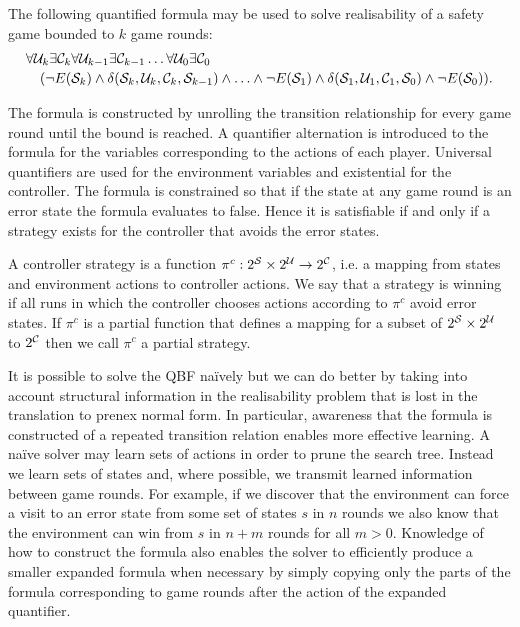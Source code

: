 The following quantified formula may be used to solve realisability of a safety game bounded to $k$ game rounds: 
\begin{equation*}
\begin{multlined}
    \forall \cU_k \exists \cC_k \forall \cU_{k-1} \exists \cC_{k-1} \ldots \forall \cU_0 \exists \cC_0 \\
    (\lnot E(\cS_k) \land \delta(\cS_k, \cU_k, \cC_k, \cS_{k-1}) \land \ldots \land \lnot E(\cS_1) \land \delta(\cS_1, \cU_1, \cC_1, \cS_0) \land \lnot E(\cS_0)).
\end{multlined}
\end{equation*}

The formula is constructed by unrolling the transition relationship for every game round until the bound is reached. A quantifier alternation is introduced to the formula for the variables corresponding to the actions of each player. Universal quantifiers are used for the environment variables and existential for the controller. The formula is constrained so that if the state at any game round is an error state the formula evaluates to false. Hence it is satisfiable if and only if a strategy exists for the controller that avoids the error states.

A controller strategy is a function $\pi^c : 2^{\mathcal{S}} \times 2^{\mathcal{U}} \to 2^{\mathcal{C}}$, i.e. a mapping from states and environment actions to controller actions. We say that a strategy is winning if all runs in which the controller chooses actions according to $\pi^c$ avoid error states. If $\pi^c$ is a partial function that defines a mapping for a subset of $2^{\mathcal{S}} \times 2^{\mathcal{U}}$ to $2^{\mathcal{C}}$ then we call $\pi^c$ a partial strategy.

It is possible to solve the QBF na\"ively but we can do better by taking into account structural information in the realisability problem that is lost in the translation to prenex normal form. In particular, awareness that the formula is constructed of a repeated transition relation enables more effective learning. A na\"ive solver may learn sets of actions in order to prune the search tree. Instead we learn sets of states and, where possible, we transmit learned information between game rounds. For example, if we discover that the environment can force a visit to an error state from some set of states $s$ in $n$ rounds we also know that the environment can win from $s$ in $n+m$ rounds for all $m > 0$. Knowledge of how to construct the formula also enables the solver to efficiently produce a smaller expanded formula when necessary by simply copying only the parts of the formula corresponding to game rounds after the action of the expanded quantifier.

